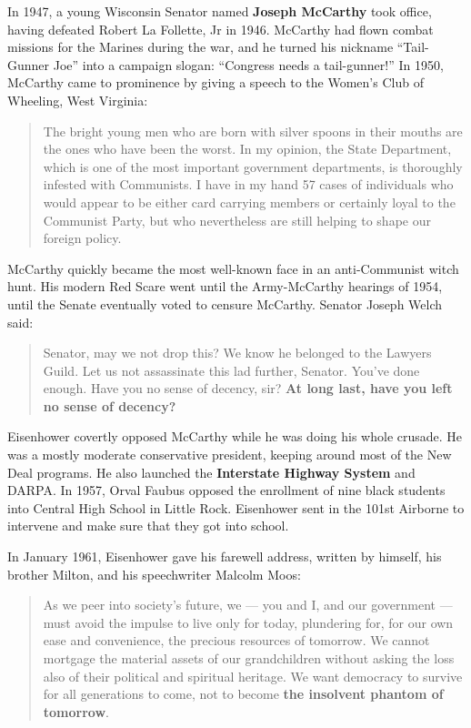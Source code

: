 In 1947, a young Wisconsin Senator named \textbf{Joseph McCarthy} took office,
having defeated Robert La Follette, Jr in 1946.
McCarthy had flown combat missions for the Marines during the war,
and he turned his nickname ``Tail-Gunner Joe'' into a campaign slogan: ``Congress needs a tail-gunner!''
In 1950, McCarthy came to prominence by giving a speech to the Women's Club of Wheeling, West Virginia:
\begin{quote}
  The bright young men who are born with silver spoons in their mouths are the ones who have been the worst.
  In my opinion, the State Department, which is one of the most important government departments,
  is thoroughly infested with Communists.
  I have in my hand 57 cases of individuals who would appear to be either card carrying members
  or certainly loyal to the Communist Party,
  but who nevertheless are still helping to shape our foreign policy.
\end{quote}
McCarthy quickly became the most well-known face in an anti-Communist witch hunt.
His modern Red Scare went until the Army-McCarthy hearings of 1954,
until the Senate eventually voted to censure McCarthy.
Senator Joseph Welch said:
\begin{quote}
  Senator, may we not drop this?
  We know he belonged to the Lawyers Guild.
  Let us not assassinate this lad further, Senator.
  You've done enough.
  Have you no sense of decency, sir?
  \textbf{At long last, have you left no sense of decency?}
\end{quote}

Eisenhower covertly opposed McCarthy while he was doing his whole crusade.
He was a mostly moderate conservative president, keeping around most of the New Deal programs.
He also launched the \textbf{Interstate Highway System} and DARPA\@.
In 1957, Orval Faubus opposed the enrollment of nine black students into Central High School in Little Rock.
Eisenhower sent in the 101st Airborne to intervene and make sure that they got into school.

In January 1961, Eisenhower gave his farewell address,
written by himself, his brother Milton, and his speechwriter Malcolm Moos:
\begin{quote}
  As we peer into society's future,
  we --- you and I, and our government --- must avoid the impulse to live only for today,
  plundering for, for our own ease and convenience, the precious resources of tomorrow.
  We cannot mortgage the material assets of our grandchildren
  without asking the loss also of their political and spiritual heritage.
  We want democracy to survive for all generations to come,
  not to become \textbf{the insolvent phantom of tomorrow}.
\end{quote}

